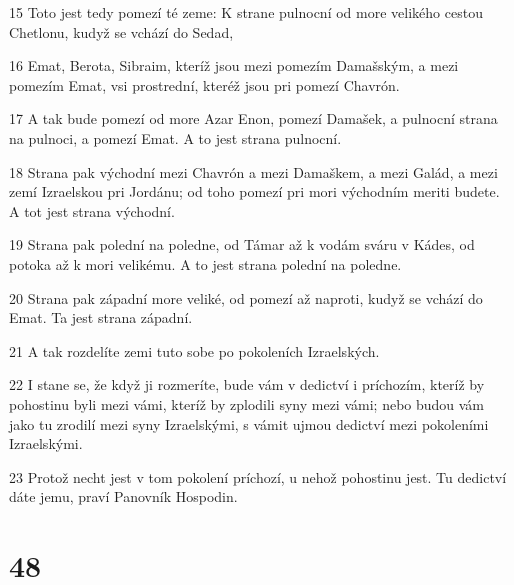\par 15 Toto jest tedy pomezí té zeme: K strane pulnocní od more velikého cestou Chetlonu, kudyž se vchází do Sedad,
\par 16 Emat, Berota, Sibraim, kteríž jsou mezi pomezím Damašským, a mezi pomezím Emat, vsi prostrední, kteréž jsou pri pomezí Chavrón.
\par 17 A tak bude pomezí od more Azar Enon, pomezí Damašek, a pulnocní strana na pulnoci, a pomezí Emat. A to jest strana pulnocní.
\par 18 Strana pak východní mezi Chavrón a mezi Damaškem, a mezi Galád, a mezi zemí Izraelskou pri Jordánu; od toho pomezí pri mori východním meriti budete. A tot jest strana východní.
\par 19 Strana pak polední na poledne, od Támar až k vodám sváru v Kádes, od potoka až k mori velikému. A to jest strana polední na poledne.
\par 20 Strana pak západní more veliké, od pomezí až naproti, kudyž se vchází do Emat. Ta jest strana západní.
\par 21 A tak rozdelíte zemi tuto sobe po pokoleních Izraelských.
\par 22 I stane se, že když ji rozmeríte, bude vám v dedictví i príchozím, kteríž by pohostinu byli mezi vámi, kteríž by zplodili syny mezi vámi; nebo budou vám jako tu zrodilí mezi syny Izraelskými, s vámit ujmou dedictví mezi pokoleními Izraelskými.
\par 23 Protož necht jest v tom pokolení príchozí, u nehož pohostinu jest. Tu dedictví dáte jemu, praví Panovník Hospodin.

\chapter{48}

